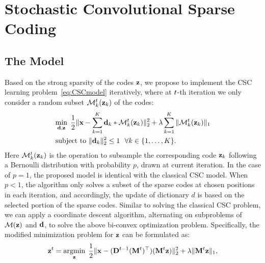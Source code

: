 \section{Stochastic Convolutional Sparse Coding}
\subsection{The Model}

Based on the strong sparsity of the codes $\code$, we propose to
implement the CSC learning problem~\eqref{eq:CSCmodel} iteratively,
where at $t$-th iteration we only consider a random subset
$\mathcal{M}_k^{\ite}(\code_k)$ of the codes:
\begin{align}
    &\mini{\filter,\code}  \frac{1}{2}\|\signal - \sum_{k=1}^{K} \filter_k * \mathcal{M}_k^{\ite}(\code_k) \|_2^2 + \lambda \sum_{k=1}^{K}\| \mathcal{M}_k^{\ite}(\code_k) \|_1  \nonumber \\
    &\text{subject to} ~ \|\filter_k\|^2_2 \leq 1 ~~ \forall k \in \{1,\dots,K\}.
\end{align}
Here $\mathcal{M}_k^{\ite}(\code_k)$ is the operation to subsample the
corresponding code $\code_k$ following a Bernoulli distribution with
probability $p$, drawn at current iteration.
In the case of $p=1$, the proposed model is identical with the
classical CSC model. When $p<1$, the algorithm only solves a subset of
the sparse codes at chosen positions in each iteration, and
accordingly, the update of dictionary $d$ is based on the selected
portion of the sparse codes. Similar to solving the classical CSC
problem, we can apply a coordinate descent algorithm, alternating on
subproblems of $\mathcal{M}(\code)$ and $\filter$, to solve the above
bi-convex optimization problem. Specifically, the modified
minimization problem for $\code$ can be formulated as:
\begin{equation} \label{eq:updatingCode}
    \code^{\ite} = \minimize{\code} \frac{1}{2}\|\signal - (\Filter^{\ite-1} (\mask^{\ite})^\top) (\mask^{\ite} \code) \|_2^2 + \lambda \|\mask^{\ite} \code\|_1,
\end{equation}
